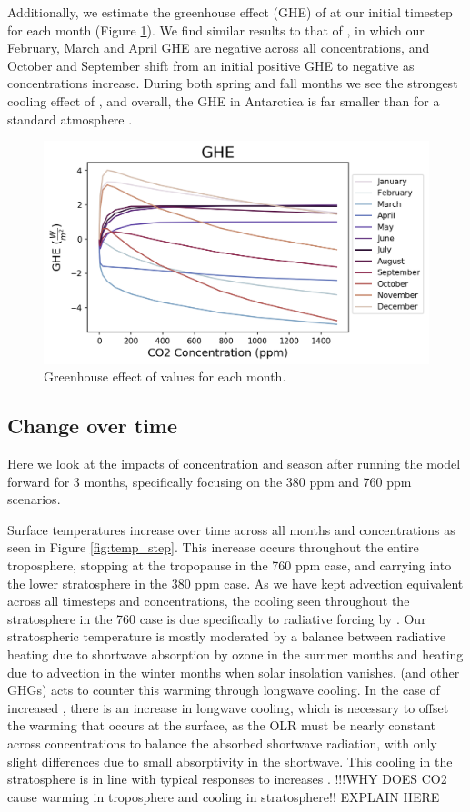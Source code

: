\documentclass[12]{article}
\begin{document}
Additionally, we estimate the greenhouse effect (GHE) of  at our initial timestep for each month (Figure \ref{fig:GHE}). We find similar results to that of \citep{schmithusen_how_2015}, in which our February, March and April GHE are negative across all  concentrations, and October and September shift from an initial positive GHE to negative as concentrations increase. During both spring and fall months we see the strongest cooling effect of , and overall, the GHE in Antarctica is far smaller than for a standard atmosphere \citep{schmithusen_how_2015}.

\begin{figure}[htb!]
\noindent\includegraphics[width=.8\textwidth]{figures/GHE.png}
\centering
\caption{Greenhouse effect of  values for each month.}
\label{fig:GHE}
\end{figure}

\subsection{Change over time}
Here we look at the impacts of  concentration and season after running the model forward for 3 months, specifically focusing on the 380 ppm and 760 ppm scenarios. 

Surface temperatures increase over time across all months and  concentrations as seen in Figure \ref{fig:temp_step}. This increase occurs throughout the entire troposphere, stopping at the tropopause in the 760 ppm case, and carrying into the lower stratosphere in the 380 ppm case. As we have kept advection equivalent across all timesteps and  concentrations, the cooling seen throughout the stratosphere in the 760 case is due specifically to radiative forcing by . Our stratospheric temperature is mostly moderated by a balance between radiative heating due to shortwave absorption by ozone in the summer months and heating due to advection in the winter months when solar insolation vanishes.  (and other GHGs) acts to counter this warming through longwave cooling. In the case of increased , there is an increase in longwave cooling, which is necessary to offset the warming that occurs at the surface, as the OLR must be nearly constant across  concentrations to balance the absorbed shortwave radiation, with only slight differences due to small  absorptivity in the shortwave. This cooling in the stratosphere is in line with typical responses to  increases \citep{rind_climate_1989, fels_stratospheric_1980}. !!!WHY DOES CO2 cause warming in troposphere and cooling in stratosphere!! EXPLAIN HERE
\end{document}
